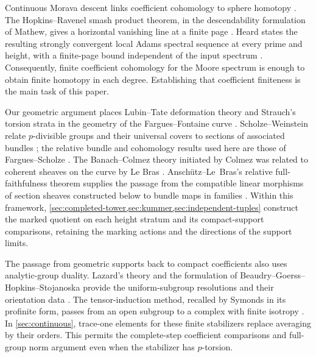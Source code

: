 Continuous Morava descent links coefficient cohomology to sphere
homotopy \citep[Theorem~1 and Appendix~A]{devinatzHopkins2004}.
The Hopkins--Ravenel smash product theorem, in the descendability
formulation of Mathew, gives a horizontal vanishing line at a finite
page \citep[Corollary~4.4, Theorem~4.18 and Proposition~10.10]{mathew2016}.
Heard states the resulting strongly convergent local Adams spectral
sequence at every prime and height, with a finite-page bound
independent of the input spectrum
\citep[Theorem~4.6 and Proposition~4.13]{heard2023}.
Consequently, finite coefficient cohomology for the Moore spectrum
is enough to obtain finite homotopy in each degree. Establishing that
coefficient finiteness is the main task of this paper.

Our geometric argument places Lubin--Tate deformation theory and
Strauch's torsion strata \citep{lubinTate1966,strauch2007} in the
geometry of the Fargues--Fontaine curve \citep{farguesFontaine2018}.
Scholze--Weinstein relate $p$-divisible groups and their universal
covers to sections of associated bundles \citep{scholzeWeinstein2013}; the relative bundle
and cohomology results used here are those of Fargues--Scholze
\citep{farguesScholze2021}.
The Banach--Colmez theory initiated by Colmez \citep{colmez2002}
was related to coherent sheaves on the curve by Le Bras
\citep{lebras2018}. Ansch\"utz--Le~Bras's relative full-faithfulness
theorem supplies the passage from the compatible linear morphisms
of section sheaves constructed below to bundle maps in families
\citep[Corollary~3.11]{anschutzLeBras2025}.
Within this framework, \cref{sec:completed-tower,sec:kummer,sec:independent-tuples}
construct the marked quotient on each height stratum and its
compact-support comparisons, retaining the marking actions and the
directions of the support limits.

The passage from geometric supports back to compact coefficients
also uses analytic-group duality. Lazard's theory and the formulation
of Beaudry--Goerss--Hopkins--Stojanoska provide the uniform-subgroup
resolutions and their orientation data \citep{lazard1965,bghs}.
The tensor-induction method, recalled by Symonds in its profinite
form, passes from an open subgroup to a complex with finite isotropy
\citep[Theorem~5.2]{symonds2007}.
In \cref{sec:continuous}, trace-one elements for these finite
stabilizers replace averaging by their orders. This permits the
complete-step coefficient comparisons and full-group norm argument
even when the stabilizer has $p$-torsion.

